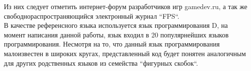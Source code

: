 Из них следует отметить интернет-форум разработчиков игр gamedev.ru,
а так же свободнораспространяющийся электронный журнал ``FPS``.
\\

В качестве референсного языка используется язык программирования D,
на момент написания данной работы, язык входил в 20 популярнейших языков
программирования. Несмотря на то, что данный язык программирования 
малоизвестен в широких кругах, представленный код будет понятен аналогичным 
для других родственных языков из семейства ``фигурных скобок``.


